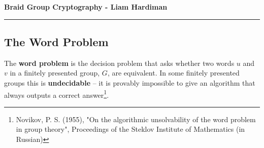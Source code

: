 \documentclass[11pt]{article}
\begin{document}
\begin{center}
{\bf \Large Braid Group Cryptography - Liam Hardiman}
\vspace{0.2cm}
\hrule
\end{center}



\subsection*{The Word Problem}
The \textbf{word problem} is the decision problem that asks whether two words $u$ and $v$ in a finitely presented group, $G$, are equivalent. In some finitely presented groups this is \textbf{undecidable} -- it is provably impossible to give an algorithm that always outputs a correct answer\footnote{Novikov, P. S. (1955), "On the algorithmic unsolvability of the word problem in group theory", Proceedings of the Steklov Institute of Mathematics (in Russian)}.
\end{document}
